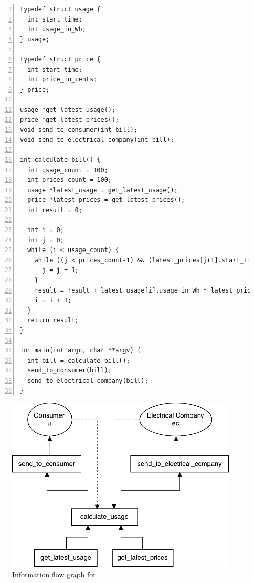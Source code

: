 \begin{lstlisting}[float, style=dlmc, numbers=left, caption={Smart meter bill calculation}, label=example:calculate_bill]
typedef struct usage {
  int start_time;
  int usage_in_Wh;
} usage;

typedef struct price {
  int start_time;
  int price_in_cents;
} price;

usage *get_latest_usage();
price *get_latest_prices();
void send_to_consumer(int bill);
void send_to_electrical_company(int bill);

int calculate_bill() {
  int usage_count = 100;
  int prices_count = 100;
  usage *latest_usage = get_latest_usage();
  price *latest_prices = get_latest_prices();
  int result = 0;

  int i = 0;
  int j = 0;
  while (i < usage_count) {
    while ((j < prices_count-1) && (latest_prices[j+1].start_time <= latest_usage[i].start_time)) {
      j = j + 1;
    }
    result = result + latest_usage[i].usage_in_Wh * latest_prices[j].price_in_cents;
    i = i + 1;
  }
  return result;
}

int main(int argc, char **argv) {
  int bill = calculate_bill();
  send_to_consumer(bill);
  send_to_electrical_company(bill);
}
\end{lstlisting}

\begin{figure}
  \centering
  \includegraphics[scale=0.8]{figures/dlm_calculate_bill}
  \caption{Information flow graph for }
  \label{example:graph:calculate_bill}
\end{figure}

